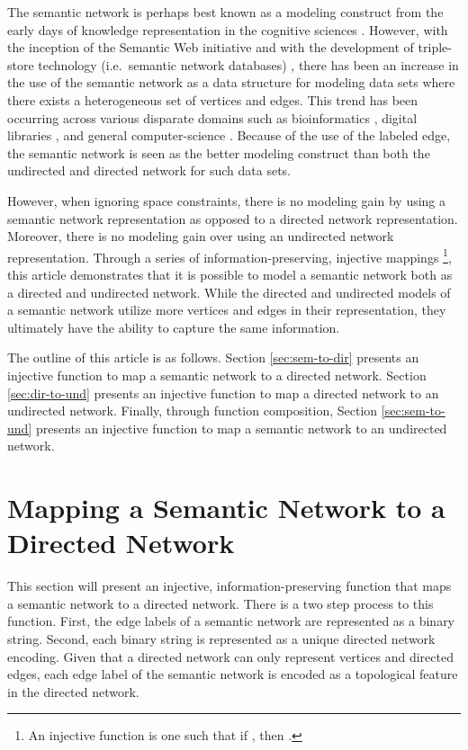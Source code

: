 \documentclass[twocolumn,preprintnumbers,amsmath,amssymb,letter]{revtex4}
\begin{document}
The semantic network is perhaps best known as a modeling construct from the early days of knowledge representation in the cognitive sciences \cite{sowa:semantic1991}. However, with the inception of the Semantic Web initiative \cite{lee:semantic2001,pubsem:lee2001} and with the development of triple-store technology (i.e.~semantic network databases) \cite{lee:triple2004,oracle:alexander2006,agraph:aasman2006}, there has been an increase in the use of the semantic network as a data structure for modeling data sets where there exists a heterogeneous set of vertices and edges. This trend has been occurring across various disparate domains such as bioinformatics \cite{sembio:quan2003,sembio:ruttenberg2007}, digital libraries \cite{lib:bax2004,semever:bollen2007}, and general computer-science \cite{rodriguez:gpsemnet2007}. Because of the use of the labeled edge, the semantic network is seen as the better modeling construct  than both the undirected and directed network for such data sets.

However, when ignoring space constraints, there is no modeling gain by using a semantic network representation as opposed to a directed network representation. Moreover, there is no modeling gain over using an undirected network representation. Through a series of information-preserving, injective mappings \footnote{An injective function is one such that if , then .}, this article demonstrates that it is possible to model a semantic network both as a directed and undirected network. While the directed and undirected models of a semantic network utilize more vertices and edges in their representation, they ultimately have the ability to capture the same information.

The outline of this article is as follows. Section \ref{sec:sem-to-dir} presents an injective function to map a semantic network to a directed network. Section \ref{sec:dir-to-und} presents an injective function to map a directed network to an undirected network. Finally, through function composition, Section \ref{sec:sem-to-und} presents an injective function to map a semantic network to an undirected network.

\section{Mapping a Semantic Network to a Directed Network\label{sec:sem-to-dir}}

This section will present an injective, information-preserving function that maps a semantic network to a directed network. There is a two step process to this function. First, the edge labels of a semantic network are represented as a binary string. Second, each binary string is represented as a unique directed network encoding. Given that a directed network can only represent vertices and directed edges, each edge label of the semantic network is encoded as a topological feature in the directed network.
\end{document}
